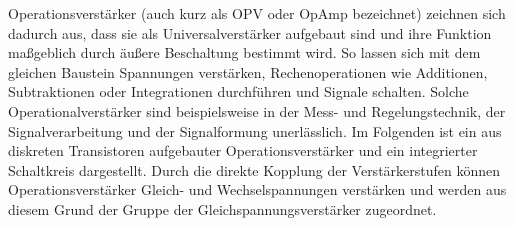 \begin{frame}
{    %



    Operationsverstärker (auch kurz als OPV oder OpAmp bezeichnet) zeichnen sich dadurch aus, 
    dass sie als Universalverstärker aufgebaut sind und ihre Funktion maßgeblich durch äußere Beschaltung bestimmt 
    wird. So lassen sich mit dem gleichen Baustein Spannungen  verstärken, Rechenoperationen wie Additionen, Subtraktionen 
    oder Integrationen durchführen und Signale schalten. Solche Operationalverstärker sind beispielsweise in der Mess- und 
    Regelungstechnik, der Signalverarbeitung und der Signalformung unerlässlich. Im Folgenden ist ein aus diskreten 
    Transistoren aufgebauter Operationsverstärker und ein integrierter Schaltkreis dargestellt.
	Durch die direkte Kopplung der Verstärkerstufen können Operationsverstärker
    Gleich- und Wechselspannungen verstärken und werden aus diesem Grund der Gruppe 
    der Gleichspannungsverstärker zugeordnet. 


}
\end{frame}
